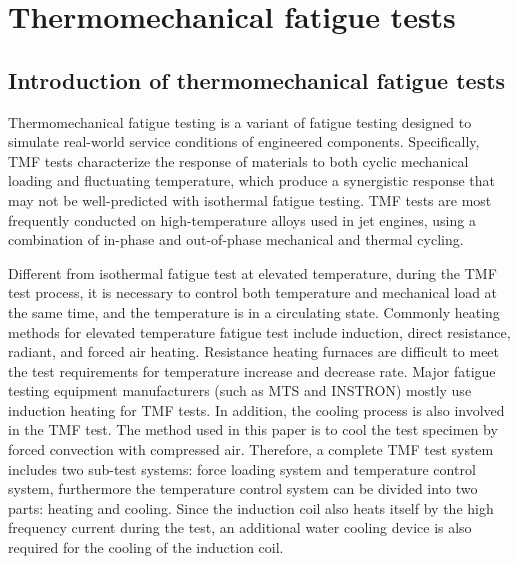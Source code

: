 \section{Thermomechanical fatigue tests}
\subsection{Introduction of thermomechanical fatigue tests}
\noindent
Thermomechanical fatigue testing is a variant of fatigue testing designed to simulate real-world service conditions of engineered components.
Specifically, TMF tests characterize the response of materials to both cyclic mechanical loading and fluctuating temperature, which produce a synergistic response that may not be well-predicted with isothermal fatigue testing.
TMF tests are most frequently conducted on high-temperature alloys used in jet engines, using a combination of in-phase and out-of-phase mechanical and thermal cycling.

Different from isothermal fatigue test at elevated temperature, during the TMF test process, it is necessary to control both temperature and mechanical load at the same time, and the temperature is in a circulating state.
Commonly heating methods for elevated temperature fatigue test include induction, direct resistance, radiant, and forced air heating.
Resistance heating furnaces are difficult to meet the test requirements for temperature increase and decrease rate. Major fatigue testing equipment manufacturers (such as MTS and INSTRON) mostly use induction heating for TMF tests.
In addition, the cooling process is also involved in the TMF test. The method used in this paper is to cool the test specimen by forced convection with compressed air.
Therefore, a complete TMF test system includes two sub-test systems: force loading system and temperature control system, furthermore the temperature control system can be divided into two parts: heating and cooling.
Since the induction coil also heats itself by the high frequency current during the test, an additional water cooling device is also required for the cooling of the induction coil.

